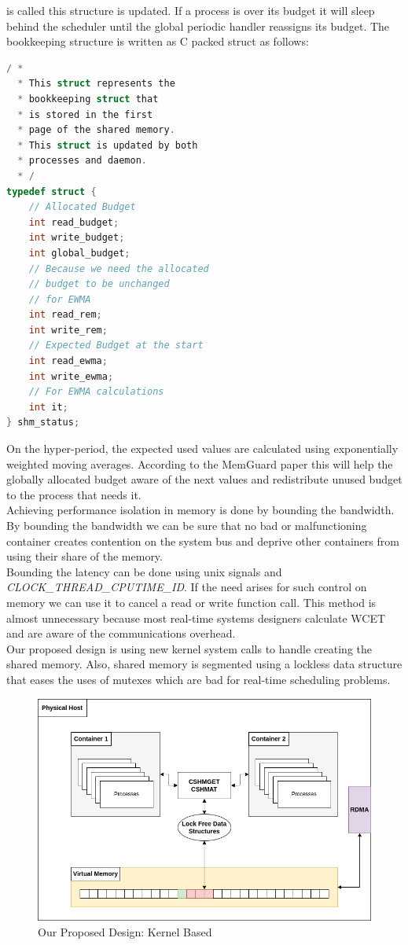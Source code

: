 \documentclass[a4paper, 11pt, twocolumn]{article}
\theoremstyle{nonumberplain}
\begin{document}
is called this structure is updated. If a process is over its budget it will
sleep behind the scheduler until the global periodic handler reassigns its
budget. The bookkeeping structure is written as C packed struct as follows:
\begin{lstlisting}[caption= Bookkeeping Struct, frame=tlrb, language=c]
/ *
  * This struct represents the
  * bookkeeping struct that
  * is stored in the first
  * page of the shared memory.
  * This struct is updated by both
  * processes and daemon.
  * /
typedef struct {
    // Allocated Budget
    int read_budget;
    int write_budget;
    int global_budget;
    // Because we need the allocated
    // budget to be unchanged
    // for EWMA
    int read_rem;
    int write_rem;
    // Expected Budget at the start
    int read_ewma;
    int write_ewma;
    // For EWMA calculations
    int it;
} shm_status;
\end{lstlisting}
On the hyper-period, the expected used values are calculated using exponentially
weighted moving averages. According to the MemGuard paper \cite{memguard} this
will help the globally allocated budget aware of the next values and
redistribute unused budget to the process that needs it. \\
Achieving performance isolation in memory is done by bounding the bandwidth.
By bounding the bandwidth we can be sure that no bad or malfunctioning
container creates contention on the system bus and deprive other containers
from using their share of the memory. \\
Bounding the latency can be done using unix signals and
\textit{CLOCK\_THREAD\_CPUTIME\_ID}. If the need arises for such control on
memory we can use it to cancel a read or write function call. This method is
almost unnecessary because most real-time systems designers calculate WCET and
are aware of the communications overhead. \\
Our proposed design is using new kernel system calls to handle creating the
shared memory. Also, shared memory is segmented using a lockless data structure
that eases the uses of mutexes which are bad for real-time scheduling problems.
\begin{figure}[H]
    \centering
    \includegraphics[scale=0.3]{dist.png}
    \caption{Our Proposed Design: Kernel Based}
\end{figure}
\end{document}
